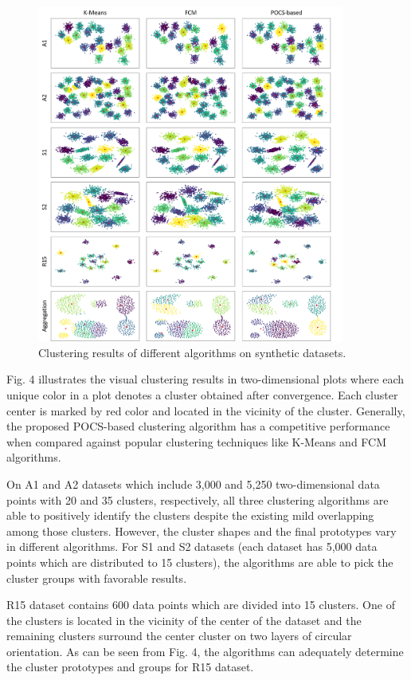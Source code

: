 \documentclass[conference]{IEEEtran}
\begin{document}
\begin{figure}[t]
    \centering
    \includegraphics[width=0.9\textwidth]{figures/all_datasets_v2.png}
    \caption{Clustering results of different algorithms on synthetic datasets.}
\end{figure}


Fig. 4 illustrates the visual clustering results in two-dimensional plots where each unique color in a plot denotes a cluster obtained after convergence. Each cluster center is marked by red color and located in the vicinity of the cluster. Generally, the proposed POCS-based clustering algorithm has a competitive performance when compared against popular clustering techniques like K-Means and FCM algorithms. 

On A1 and A2 datasets which include 3,000 and 5,250 two-dimensional data points with 20 and 35 clusters, respectively, all three clustering algorithms are able to positively identify the clusters despite the existing mild overlapping among those clusters. However, the cluster shapes and the final prototypes vary in different algorithms. For S1 and S2 datasets (each dataset has 5,000 data points which are distributed to 15 clusters), the algorithms are able to pick the cluster groups with favorable results.

R15 dataset contains 600 data points which are divided into 15 clusters. One of the clusters is located in the vicinity of the center of the dataset and the remaining clusters surround the center cluster on two layers of circular orientation. As can be seen from Fig. 4, the algorithms can adequately determine the cluster prototypes and groups for R15 dataset.
\end{document}
